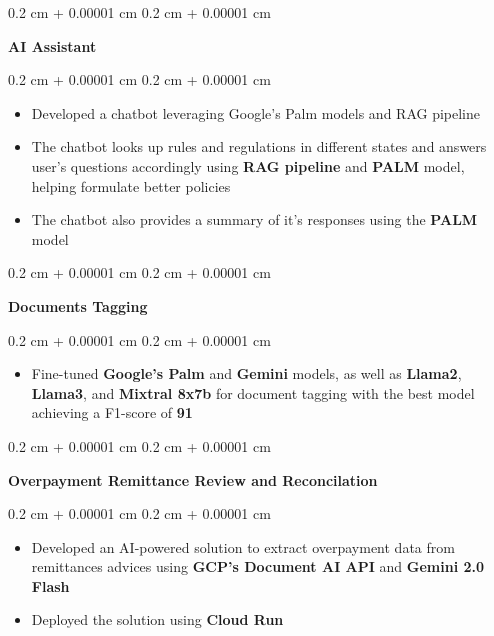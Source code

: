 \documentclass[10pt, letterpaper]{article}
\newenvironment{highlights}{
    \begin{itemize}[
        topsep=0.10 cm,
        parsep=0.10 cm,
        partopsep=0pt,
        itemsep=0pt,
        leftmargin=0.4 cm + 10pt
    ]
}{
    \end{itemize}
} %
\newenvironment{onecolentry}{
    \begin{adjustwidth}{
        0.2 cm + 0.00001 cm
    }{
        0.2 cm + 0.00001 cm
    }
}{
    \end{adjustwidth}
} %
\begin{document}
        \vspace{0.2 cm}

        \begin{onecolentry}
            \textbf{AI Assistant}
        \end{onecolentry}
        \vspace{0.10 cm}
        \begin{onecolentry}
            \begin{highlights}
                \item Developed a chatbot leveraging Google’s Palm models and RAG pipeline
                \item The chatbot looks up rules and regulations in different states and answers user’s questions accordingly using \textbf{RAG pipeline} and \textbf{PALM} model, helping formulate better policies
                \item The chatbot also provides a summary of it's responses using the \textbf{PALM} model
            \end{highlights}
        \end{onecolentry}
        
        \vspace{0.2 cm}

        \begin{onecolentry}
            \textbf{Documents Tagging}
        \end{onecolentry}
        \vspace{0.10 cm}
        \begin{onecolentry}
            \begin{highlights}
                \item Fine-tuned \textbf{Google’s Palm} and \textbf{Gemini} models, as well as \textbf{Llama2}, \textbf{Llama3}, and \textbf{Mixtral 8x7b} for document tagging with the best model achieving a F1-score of \textbf{91}
            \end{highlights}
        \end{onecolentry}
        
        \vspace{0.2 cm}

        \begin{onecolentry}
            \textbf{Overpayment Remittance Review and Reconcilation}
        \end{onecolentry}
        \vspace{0.10 cm}
        \begin{onecolentry}
            \begin{highlights}
                \item Developed an AI-powered solution to extract overpayment data from remittances advices using \textbf{GCP's Document AI API} and \textbf{Gemini 2.0 Flash}
                \item Deployed the solution using \textbf{Cloud Run}
            \end{highlights}
        \end{onecolentry}
        
\end{document}
